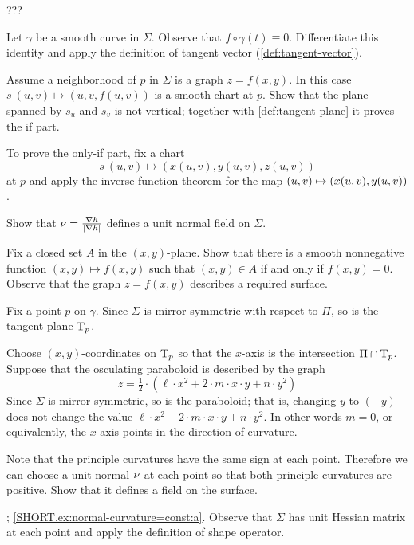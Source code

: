 ???

Let $\gamma$ be a smooth curve in $\Sigma$.
Observe that $f\circ\gamma(t)\equiv 0$.
Differentiate this identity and apply the definition of tangent vector (\ref{def:tangent-vector}).

Assume a neighborhood of $p$ in $\Sigma$ is a graph $z=f(x,y)$.
In this case $s\:(u,v)\mapsto (u,v,f(u,v))$ is a smooth chart at $p$.
Show that the plane spanned by $s_u$ and $s_v$ is not vertical;
together with \ref{def:tangent-plane} it proves the if part.

To prove the only-if part, fix a chart 
\[s\:(u,v)\mapsto(x(u,v),y(u,v),z(u,v))\] at $p$ and apply the inverse function theorem for the map $(u,v)\z\mapsto(x(u,v),y(u,v))$.


 Show that $\nu=\tfrac{\nabla h}{|\nabla h|}$ defines a unit normal field on $\Sigma$.

Fix a closed set $A$ in the $(x,y)$-plane.
Show that there is a smooth nonnegative function $(x,y)\mapsto f(x,y)$ such that $(x,y)\in A$ if and only if $f(x,y)=0$.
Observe that the graph $z=f(x,y)$ describes a required surface.

Fix a point $p$ on $\gamma$.
Since $\Sigma$ is mirror symmetric with respect to $\Pi$,
so is the tangent plane $\mathrm{T}_p$.

Choose $(x,y)$-coordinates on $\mathrm{T}_p$ so that the $x$-axis is the intersection $\Pi\cap  \mathrm{T}_p$.
Suppose that the osculating paraboloid is described by the graph 
\[z=\tfrac12\cdot(\ell\cdot x^2+2\cdot m\cdot x\cdot y+n\cdot y^2)\]
Since $\Sigma$ is mirror symmetric, so is the paraboloid;
that is, changing $y$ to $(-y)$ does not change the value 
$\ell\cdot x^2+2\cdot m\cdot x\cdot y+n\cdot y^2$.
In other words $m=0$, or equivalently, the $x$-axis points in the direction of curvature.

 Note that the principle curvatures have the same sign at each point.
Therefore we can choose a unit normal $\nu$ at each point so that both principle curvatures are positive.
Show that it defines a field on the surface.


\parbf{\ref{ex:normal-curvature=const}}; \ref{SHORT.ex:normal-curvature=const:a}.
Observe that $\Sigma$ has unit Hessian matrix at each point and apply the definition of shape operator.

